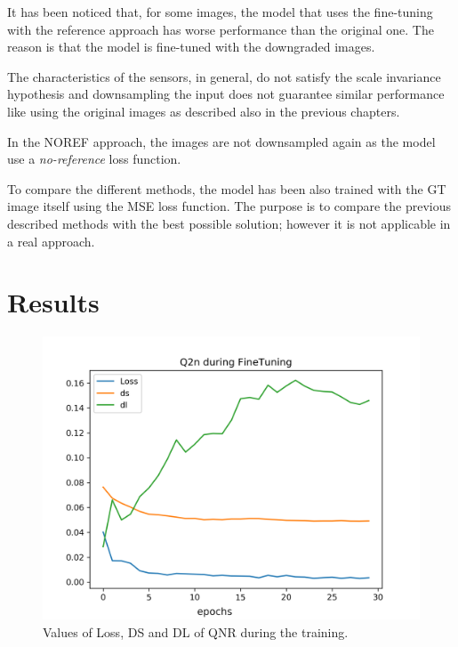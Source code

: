\documentclass[12pt]{report}
\begin{document}
It has been noticed that, for some images, the model that uses the fine-tuning with the reference approach has worse performance than the original one.
The reason is that the model is fine-tuned with the downgraded images.

The characteristics of the sensors, in general, do not satisfy the scale invariance hypothesis and downsampling the input does not guarantee similar performance like using the original images
as described also in the previous chapters.

In the NOREF approach, the images are not downsampled again as the model use a \textit{no-reference} loss function.

To compare the different methods, the model has been also trained with the GT image itself using the MSE loss function.
The purpose is to compare the previous described methods with the best possible solution; however it is not applicable in a real approach.

\section{Results}
\begin{figure}[t]
    \centering
    \includegraphics[scale=.7]{qnr1.png}
    \caption{Values of Loss, DS and DL of QNR during the training.}
    \label{fig:qnr1}
\end{figure}
\end{document}
